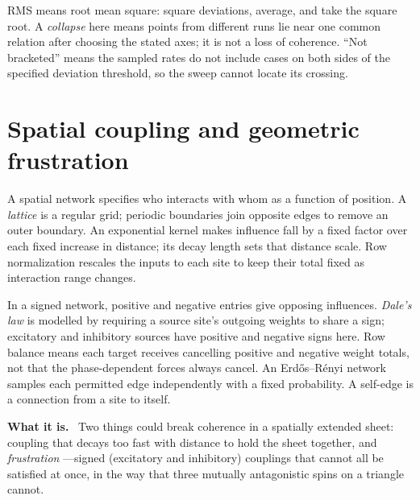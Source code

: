 \documentclass[11pt]{article}
\newcommand{\what}{\par\smallskip\noindent\textbf{What it is.}\ }
\begin{document}
RMS means root mean square: square deviations, average, and take the square
root. A \emph{collapse} here means points from different runs lie near one
common relation after choosing the stated axes; it is not a loss of coherence.
``Not bracketed'' means the sampled rates do not include cases on both sides
of the specified deviation threshold, so the sweep cannot locate its crossing.

\section{Spatial coupling and geometric frustration}

A spatial network specifies who interacts with whom as a function of position.
A \emph{lattice} is a regular grid; periodic boundaries join opposite edges
to remove an outer boundary. An exponential kernel makes influence fall by a
fixed factor over each fixed increase in distance; its decay length sets that
distance scale. Row normalization rescales the inputs to each site to keep
their total fixed as interaction range changes.

In a signed network, positive and negative entries give opposing influences.
\emph{Dale's law} is modelled by requiring a source site's outgoing weights
to share a sign; excitatory and inhibitory sources have positive and negative
signs here. Row balance means each target receives cancelling positive and
negative weight totals, not that the phase-dependent forces always cancel.
An Erd\H{o}s--R\'enyi network samples each permitted edge independently with a
fixed probability. A self-edge is a connection from a site to itself.

\what
Two things could break coherence in a spatially extended sheet: coupling that
decays too fast with distance to hold the sheet together, and \emph{frustration}
---signed (excitatory and inhibitory) couplings that cannot all be satisfied at
once, in the way that three mutually antagonistic spins on a triangle cannot.
\end{document}
